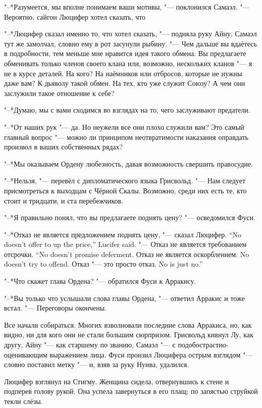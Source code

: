 "--*Разумеется, мы вполне понимаем ваши мотивы, "--- поклонился Самаэл.
"--- Вероятно, сайгон Люцифер хотел сказать, что\ldotst

"--*Люцифер сказал именно то, что хотел сказать, "--- подняла руку Айну.
Самаэл тут же замолчал, словно ему в рот засунули рыбину.
"--- Чем дальше вы вдаётесь в подробности, тем меньше мне нравится идея такого обмена.
Вы предлагаете обменивать только членов своего клана или, возможно, нескольких кланов "--- я не в курсе деталей.
На кого?
На наёмников или отбросов, которые не нужны даже вам?
К дьяволу такой обмен.
На тех, кто уже служит Союзу?
А чем они заслужили такое отношение к себе?

"--*Думаю, мы с вами сходимся во взглядах на то, чего заслуживают предатели.

"--*От наших рук "--- да.
Но неужели все они плохо служили вам?
Это самый главный вопрос "--- можно ли принципом неотвратимости наказания оправдать произвол в ваших собственных рядах?

"--*Мы оказываем Ордену любезность, давая возможность свершить правосудие.

"--*Нельзя, "--- перевёл с дипломатического языка Грисвольд.
"--- Нам следует присмотреться к выходцам с Чёрной Скалы.
Возможно, среди них есть те, кто стоит и тридцати, и ста перебежчиков.

"--*Я правильно понял, что вы предлагаете поднять цену? "--- осведомился Фуси.

{"--*Отказ не является предложением поднять цену, "--- сказал Люцифер.}
{``No doesn't offer to up the price,'' Lucifer said.}
{"--- Отказ не является требованием отсрочки.}
{``No doesn't promise deferment.}
{Отказ не является оскорблением.}
{No doesn't try to offend.}
{Отказ "--- это просто отказ.}
{No is just no.''}

"--*Что скажет глава Ордена? "--- обратился Фуси к Арракису.

"--*Вы только что услышали слова главы Ордена, "--- ответил Арракис и тоже встал.
"--- Переговоры окончены.

Все начали собираться.
Многих взволновали последние слова Арракиса, но, как видно, ни для кого они не стали большим сюрпризом.
Грисвольд кивнул Лу, как другу, Айну "--- как старшему по званию, Самаэл "--- с подобострастно-оценивающим выражением лица.
Фуси пронзил Люцифера острым взглядом "--- словно поставил метку "--- и, взяв за руку Нуива, удалился.

Люцифер взглянул на Стигму.
Женщина сидела, отвернувшись к стене и подперев голову рукой.
Она успела завернуться в его плащ;
по запястью струйкой текли слёзы.

